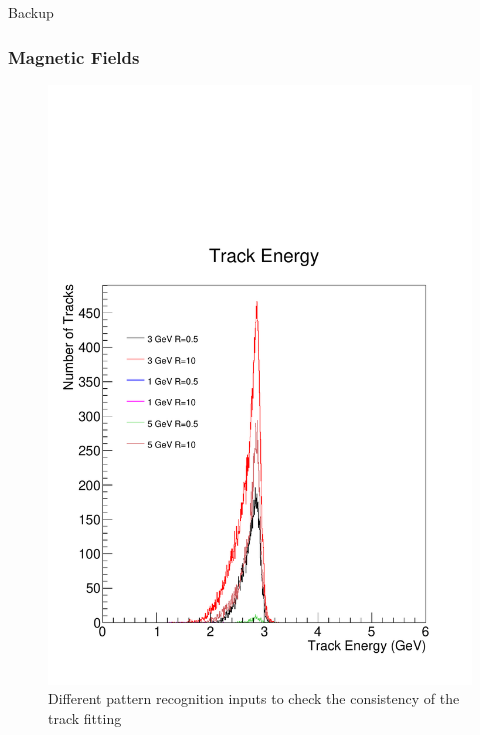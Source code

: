 \documentclass{beamer}
\begin{document}
\begin{frame}
Backup
\end{frame}
\begin{frame}
\frametitle{Magnetic Fields}
\begin{figure}
\includegraphics[width=0.45\linewidth]{pics/beamE3B1.pdf}
\tiny{
\caption{Different pattern recognition inputs to check the consistency of the track fitting}
}
\end{figure}
\end{frame}
\end{document}
